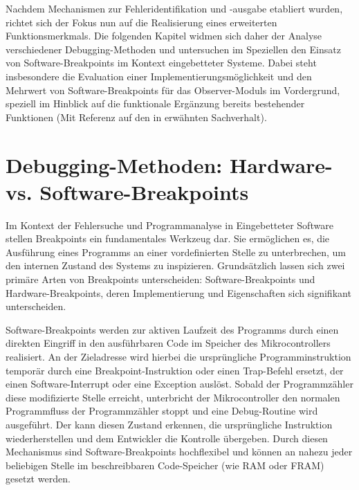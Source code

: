 Nachdem Mechanismen zur Fehleridentifikation und -ausgabe etabliert wurden, richtet sich der Fokus nun auf die Realisierung eines erweiterten Funktionsmerkmals. Die folgenden Kapitel widmen sich daher der Analyse verschiedener Debugging-Methoden und untersuchen im Speziellen den Einsatz von Software-Breakpoints im Kontext eingebetteter Systeme. Dabei steht insbesondere die Evaluation einer Implementierungsm\"oglichkeit und den Mehrwert von Software-Breakpoints f\"ur das Observer-Moduls im Vordergrund, speziell im Hinblick auf die funktionale Erg\"anzung bereits bestehender Funktionen (Mit Referenz auf den in  erw\"ahnten Sachverhalt).\AI


\newpage
\section{Debugging-Methoden: Hardware- vs. Software-Breakpoints}
\label{sec:Hardware_VS_Software_Breakpoints}

Im Kontext der Fehlersuche und Programmanalyse in Eingebetteter Software stellen Breakpoints ein fundamentales Werkzeug dar. Sie erm\"oglichen es, die Ausf\"uhrung eines Programms an einer vordefinierten Stelle zu unterbrechen, um den internen Zustand des Systems zu inspizieren. Grunds\"atzlich lassen sich zwei prim\"are Arten von Breakpoints unterscheiden: Software-Breakpoints und Hardware-Breakpoints, deren Implementierung und Eigenschaften sich signifikant unterscheiden.

Software-Breakpoints werden zur aktiven Laufzeit des Programms durch einen direkten Eingriff in den ausf\"uhrbaren Code im Speicher des Mikrocontrollers realisiert. An der Zieladresse wird hierbei die urspr\"ungliche Programminstruktion tempor\"ar durch eine Breakpoint-Instruktion oder einen Trap-Befehl ersetzt, der einen Software-Interrupt oder eine Exception ausl\"ost. Sobald der Programmz\"ahler diese modifizierte Stelle erreicht, unterbricht der Mikrocontroller den normalen Programmfluss der Programmz\"ahler stoppt und eine Debug-Routine wird ausgef\"uhrt. Der  kann diesen Zustand erkennen, die urspr\"ungliche Instruktion wiederherstellen und dem Entwickler die Kontrolle \"ubergeben. Durch diesen Mechanismus sind Software-Breakpoints hochflexibel und k\"onnen an nahezu jeder beliebigen Stelle im beschreibbaren Code-Speicher (wie RAM oder FRAM) gesetzt werden.


